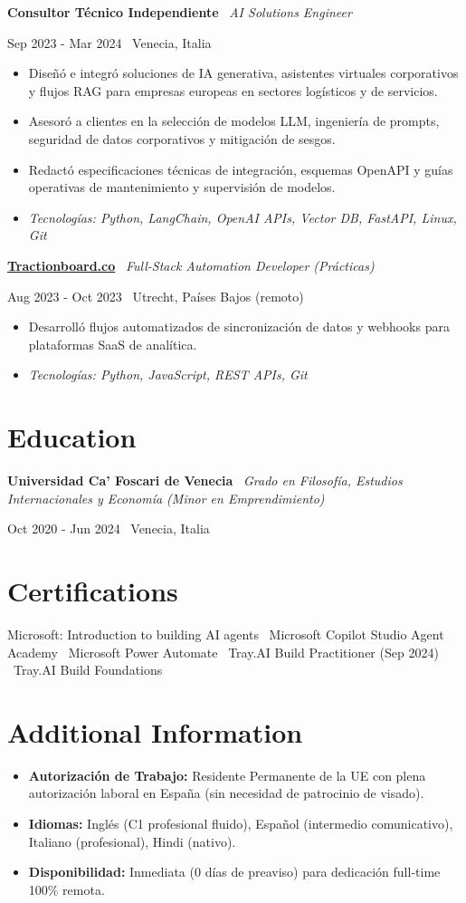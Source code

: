 \documentclass[a4paper,10pt]{article}
\newcommand{\role}[4]{%
  \vspace{2pt}\noindent
  \begin{minipage}[t]{0.70\textwidth}\raggedright\textbf{#1} \textbullet\ \textit{#3}\end{minipage}%
  \hfill
  \begin{minipage}[t]{0.28\textwidth}\raggedleft\footnotesize\color{gray}#2 \textbullet\ #4\end{minipage}%
  \vspace{1pt}%
}
\begin{document}
\role{Consultor Técnico Independiente}{Sep 2023 - Mar 2024}{AI Solutions Engineer}{Venecia, Italia}
\begin{itemize}
  \item Diseñó e integró soluciones de IA generativa, asistentes virtuales corporativos y flujos RAG para empresas europeas en sectores logísticos y de servicios.
  \item Asesoró a clientes en la selección de modelos LLM, ingeniería de prompts, seguridad de datos corporativos y mitigación de sesgos.
  \item Redactó especificaciones técnicas de integración, esquemas OpenAPI y guías operativas de mantenimiento y supervisión de modelos.
  \item \textit{Tecnologías: Python, LangChain, OpenAI APIs, Vector DB, FastAPI, Linux, Git}
\end{itemize}

\role{\href{https://tractionboard.co}{Tractionboard.co}}{Aug 2023 - Oct 2023}{Full-Stack Automation Developer (Prácticas)}{Utrecht, Países Bajos (remoto)}
\begin{itemize}
  \item Desarrolló flujos automatizados de sincronización de datos y webhooks para plataformas SaaS de analítica.
  \item \textit{Tecnologías: Python, JavaScript, REST APIs, Git}
\end{itemize}

\section{Education}
\role{Universidad Ca' Foscari de Venecia}{Oct 2020 - Jun 2024}{Grado en Filosofía, Estudios Internacionales y Economía (Minor en Emprendimiento)}{Venecia, Italia}

\section{Certifications}
Microsoft: Introduction to building AI agents \textbullet\ Microsoft Copilot Studio Agent Academy \textbullet\ Microsoft Power Automate \textbullet\ Tray.AI Build Practitioner (Sep 2024) \textbullet\ Tray.AI Build Foundations

\section{Additional Information}
\begin{itemize}
  \item \textbf{Autorización de Trabajo:} Residente Permanente de la UE con plena autorización laboral en España (sin necesidad de patrocinio de visado).
  \item \textbf{Idiomas:} Inglés (C1 profesional fluido), Español (intermedio comunicativo), Italiano (profesional), Hindi (nativo).
  \item \textbf{Disponibilidad:} Inmediata (0 días de preaviso) para dedicación full-time 100\% remota.
\end{itemize}
\end{document}
